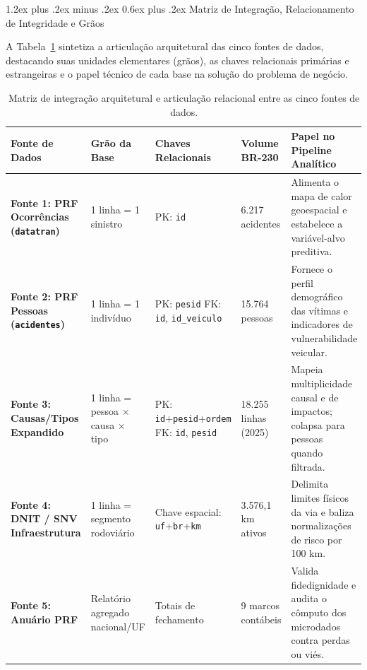 \documentclass[11pt,a4paper]{article}
\makeatletter
\renewcommand\subsection{
\@startsection{subsection}{2}{0pt}%
{1.2ex plus .2ex minus .2ex}%
{0.6ex plus .2ex}%
{\normalfont\large\bfseries\color{secondary}}
}
\makeatother
\begin{document}
\subsection{Matriz de Integração, Relacionamento de Integridade e Grãos}

A Tabela~\ref{tab:matriz_integracao} sintetiza a articulação arquitetural das cinco fontes de dados, destacando suas unidades elementares (grãos), as chaves relacionais primárias e estrangeiras e o papel técnico de cada base na solução do problema de negócio.

\begin{table}[H]
\centering
\small
\renewcommand{\arraystretch}{1.2}
\caption{Matriz de integração arquitetural e articulação relacional entre as cinco fontes de dados.}
\label{tab:matriz_integracao}
\begin{tabularx}{\textwidth}{|p{3.2cm}|p{2.4cm}|p{2.6cm}|p{2.0cm}|X|}
\hline
\textbf{Fonte de Dados} & \textbf{Grão da Base} & \textbf{Chaves Relacionais} & \textbf{Volume BR-230} & \textbf{Papel no Pipeline Analítico} \\
\hline
\textbf{Fonte 1: PRF Ocorrências (\texttt{datatran})} & 1 linha = 1 sinistro & PK: \texttt{id} & 6.217 acidentes & Alimenta o mapa de calor geoespacial e estabelece a variável-alvo preditiva. \\
\hline
\textbf{Fonte 2: PRF Pessoas (\texttt{acidentes})} & 1 linha = 1 indivíduo & PK: \texttt{pesid} \newline FK: \texttt{id}, \texttt{id\_veiculo} & 15.764 pessoas & Fornece o perfil demográfico das vítimas e indicadores de vulnerabilidade veicular. \\
\hline
\textbf{Fonte 3: Causas/Tipos Expandido} & 1 linha = pessoa $\times$ causa $\times$ tipo & PK: \texttt{id}+\texttt{pesid}+\texttt{ordem} \newline FK: \texttt{id}, \texttt{pesid} & 18.255 linhas (2025) & Mapeia multiplicidade causal e de impactos; colapsa para pessoas quando filtrada. \\
\hline
\textbf{Fonte 4: DNIT / SNV Infraestrutura} & 1 linha = segmento rodoviário & Chave espacial: \texttt{uf}+\texttt{br}+\texttt{km} & 3.576,1 km ativos & Delimita limites físicos da via e baliza normalizações de risco por 100 km. \\
\hline
\textbf{Fonte 5: Anuário PRF} & Relatório agregado nacional/UF & Totais de fechamento & 9 marcos contábeis & Valida fidedignidade e audita o cômputo dos microdados contra perdas ou viés. \\
\hline
\end{tabularx}
\end{table}
\end{document}
